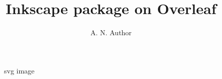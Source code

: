 \documentclass{article}
\title{Inkscape package on Overleaf }
\author{A. N. Author}
\begin{document}
\maketitle

\begin{figure}[htbp]
    \centering
    
    \caption{svg image}
\end{figure}
\end{document}
